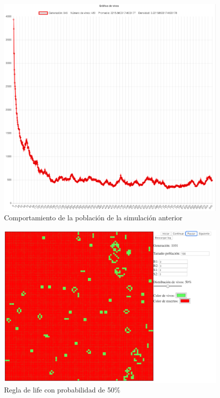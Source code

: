 	\begin{figure}[H]
		\begin{center}
			\includegraphics[scale=.24]{GOL/img/life40-2.png}
			\caption{Comportamiento de la población de la simulación anterior}
			\label{fig:gol5}
		\end{center}
	\end{figure}

	\begin{figure}[H]
		\begin{center}
			\includegraphics[scale=.3]{GOL/img/life50-1.png}
			\caption{Regla de life con probabilidad de 50\%}
			\label{fig:gol5}
		\end{center}
	\end{figure}

